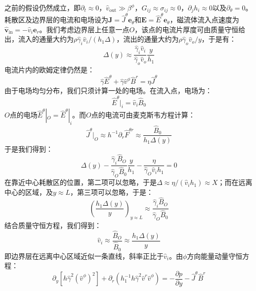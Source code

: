 \documentclass[lang=cn,color=blue,cm,11pt,scheme=chinese,bibend=bibtex,sorting=nty]{elegantbook}
\begin{document}
	之前的假设仍然成立，即$\partial_t \approx 0$，$\hat{v}_{\text{out}} \gg \beta^{\phi}$，$G_{ij} \approx \sigma_{ij} \approx 0$，$\partial_j h_i \approx 0$以及$\partial_{\theta} = 0$。耗散区及边界层的电流和电场设为$\bm{J} = \hat{J}^{\theta} \bm{e}_{\theta}$和$\bm{E} = \hat{E}^{\theta} \bm{e}_{\theta}$，磁流体流入点速度为$\hat{\bm{v}}_{\text{in}} = - \hat{v}_i \bm{e}_r$。我们考虑边界层上任意一点$O$，该点的电流片厚度可由质量守恒给出，流入的通量大约为$\rho \hat{\gamma}_i \hat{v}_i / (h_1 \Delta)$，流出的通量大约为$\rho \hat{\gamma}_o \hat{v}_o / y$，于是有：
	\begin{equation}
		\Delta (y) \approx \frac{\hat{\gamma}_i \hat{v}_i}{\hat{\gamma}_o \hat{v}_o} \frac{y}{h_1}
	\end{equation}
	电流片内的欧姆定律仍然是：
	\begin{equation}
		\hat{\gamma} \hat{E}^{\theta} + \hat{\gamma} \hat{v}^{\phi} \hat{B}^r = \eta \hat{J}^{\theta}
	\end{equation}
	由于电场均匀分布，我们只须计算一处的电场。在流入点，电场为：
	\begin{equation}
		\hat{E}^{\theta} |_i = \hat{v}_i \hat{B}_0
	\end{equation}
	$O$点的电场$\hat{E}^{\theta} |_O = \hat{E}^{\theta} |_i$。而$O$点的电流可由麦克斯韦方程计算：
	\begin{equation}
		\hat{J}^{\theta} |_O \approx h^{- 1} \partial_r \hat{F}^{\theta r} \approx \frac{\hat{B}_0}{h_1 \Delta (y)}
	\end{equation}
	于是我们得到：
	\begin{equation}
		\Delta (y) - \frac{\hat{\gamma}_i \hat{B}_O}{\hat{\gamma}_O \hat{B}_0} \frac{y}{h_1} - \frac{\eta}{\hat{\gamma}_O \hat{v}_i h_1} = 0
	\end{equation}
	在靠近中心耗散区的位置，第二项可以忽略，于是$\Delta \approx \eta / (\hat{v}_i h_1) \approx X$；而在远离中心的区域，及$y \approx L$，第三项可以忽略，于是：
	\begin{equation}
		\left( \frac{h_1 \Delta (y)}{y} \right)_{y \approx L} \approx \frac{\hat{\gamma}_i \hat{B}_O}{\hat{\gamma}_O \hat{B}_0}
	\end{equation}
	结合质量守恒方程，我们得到：
	\begin{equation}
		\hat{v}_i \approx \frac{\hat{B}_O}{\hat{B}_0} \approx \frac{h_1 \Delta (y)}{y}
	\end{equation}
	即边界层在远离中心区域近似一条直线，斜率正比于$\hat{v}_i$。由$\phi$方向能量动量守恒方程：
	\begin{equation}
		\partial_y [h \hat{\gamma}^2 (\hat{v}^{\phi})^2] + \partial_r (h_1^{- 1} h \hat{\gamma}^2 \hat{v}^r \hat{v}^{\phi}) = - \frac{\partial p}{\partial y} - \hat{J}^{\theta} \hat{B}^r
	\end{equation}
\end{document}
